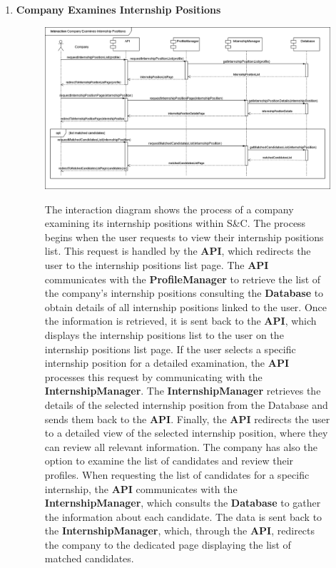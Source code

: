 \begin{enumerate}
    \newpage
    \item \textbf{Company Examines Internship Positions}
    \begin{figure}[h!]
            \centering  \includegraphics[width=1\textwidth]{DD/Images/Interactions/INT11_CompanyExaminesInternshipPosition.drawio.png}
            \label{fig:ComponentViewDiagram}
            \caption*{The interaction diagram shows the process of a company examining its internship positions within S\&C. The process begins when the user requests to view their internship positions list. This request is handled by the \textbf{API}, which redirects the user to the internship positions list page. The \textbf{API} communicates with the \textbf{ProfileManager} to retrieve the list of the company’s internship positions consulting the \textbf{Database} to obtain details of all internship positions linked to the user. 
            Once the information is retrieved, it is sent back to the \textbf{API}, which displays the internship positions list to the user on the internship positions list page.
            If the user selects a specific internship position for a detailed examination, the \textbf{API} processes this request by communicating with the \textbf{InternshipManager}. The \textbf{InternshipManager} retrieves the details of the selected internship position from the Database and sends them back to the \textbf{API}. Finally, the \textbf{API} redirects the user to a detailed view of the selected internship position, where they can review all relevant information.
            The company has also the option to examine the list of candidates and review their profiles. When requesting the list of candidates for a specific internship, the \textbf{API} communicates with the \textbf{InternshipManager}, which consults the \textbf{Database} to gather the information about each candidate. The data is sent back to the \textbf{InternshipManager}, which, through the \textbf{API}, redirects the company to the dedicated page displaying the list of matched candidates.
            }
    \end{figure}


\end{enumerate}
